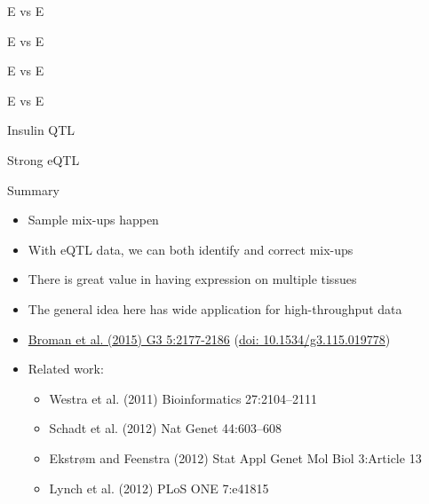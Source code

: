 \documentclass[12pt,t]{beamer}
\begin{document}
\begin{frame}[c]{E vs E}
\note{}
\end{frame}


\begin{frame}[c]{E vs E}
\note{}
\end{frame}


\begin{frame}[c]{E vs E}
\note{}
\end{frame}


\begin{frame}[c]{E vs E}
\note{}
\end{frame}

\begin{frame}[c]{Insulin QTL}
\note{}
\end{frame}


\begin{frame}[c]{Strong eQTL}
\note{}
\end{frame}


\begin{frame}[c]{Summary}


\begin{itemize}
\itemsep12pt

\item Sample mix-ups happen


\item With eQTL data, we can both identify and {\hilit correct} mix-ups

\item There is great value in having expression on multiple tissues

\item The general idea here has wide application for high-throughput data

\item \href{https://www.ncbi.nlm.nih.gov/pubmed/26290572}{Broman et al. (2015) G3 5:2177-2186}
(\href{http://doi.org/10.1534/g3.115.019778}{doi: 10.1534/g3.115.019778})

\item Related work:

\begin{itemize}
\item Westra et al. (2011) Bioinformatics 27:2104--2111
\item Schadt et al. (2012) Nat Genet 44:603--608
\item Ekstr{\o}m and Feenstra (2012) Stat Appl Genet Mol Biol
  3:Article 13
\item Lynch et al. (2012) PLoS ONE 7:e41815
\end{itemize}

\end{itemize}
\note{}
\end{frame}
\end{document}
